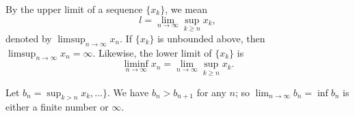 \begin{defn}
By the upper limit of a sequence $\{x_k\}$, we mean 
\begin{equation}
    l = \lim_{n\to \infty} \sup _{k\ge n} x_k, 
\end{equation}
denoted by $\limsup_{n\to\infty} x_n$. If $\{x_k\}$ is unbounded above, then 
$\limsup_{n\to\infty} x_n = \infty$.
Likewise, the lower limit of $\{x_k\}$ is 
\begin{equation}
    \liminf _{n \to \infty} x_n = \lim_{n\to\infty}\sup_{k\ge n} x_k.
\end{equation}
\end{defn}

Let $b_n = \sup_{k > n} x_k, \ldots\}$. We have $b_n > b_{n+1}$ for any $n$;
so $\lim_{n\to\infty}b_n = \inf b_n$ is either a finite number or $\infty$.

